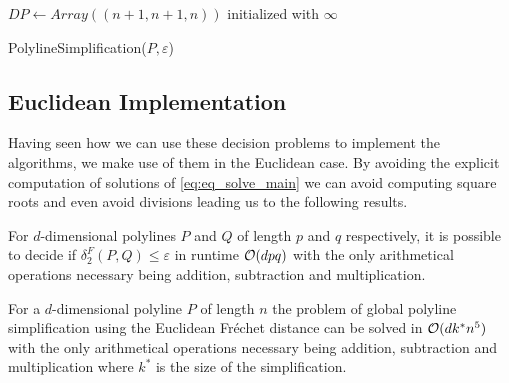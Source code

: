 \begin{algorithm}[ht]
  \DontPrintSemicolon
  \BlankLine
  \(DP \gets Array((n + 1, n + 1, n))\) initialized with \(\infty\) \;
  \caption{PolylineSimplification(\(P, \varepsilon\))}
  \label{algo:simplify_simple_implicit}
\end{algorithm}


\subsection{Euclidean Implementation}\label{ssec:euclidean-impl}
Having seen how we can use these decision problems to implement the algorithms, we make use of them in the Euclidean case. By avoiding the explicit computation of solutions of \cref{eq:eq_solve_main} we can avoid computing square roots and even avoid divisions leading us to the following results. 

\begin{theorem}
  For \(d\)-dimensional polylines \(P\) and \(Q\) of length \(p\) and \(q\) respectively, it is possible to decide if \(\delta_2^F(P, Q) \leq \varepsilon\) in runtime \(\mathcal{O}(d p q)\) with the only arithmetical operations necessary being addition, subtraction and multiplication. 
\end{theorem}

\begin{theorem}\label{thm:euclidean_implicit_simplification_simple}
  For a \(d\)-dimensional polyline \(P\) of length \(n\) the problem of global polyline simplification using the Euclidean Fréchet distance can be solved in \(\mathcal{O}(d k^*n^5)\) with the only arithmetical operations necessary being addition, subtraction and multiplication where \(k^*\) is the size of the simplification.
\end{theorem}

